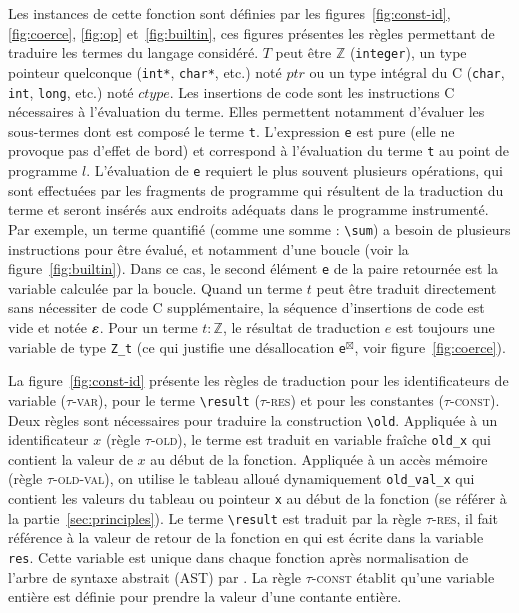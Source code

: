 Les instances de cette fonction sont définies par les
figures~\ref{fig:const-id}, \ref{fig:coerce}, \ref{fig:op} et~\ref{fig:builtin},
ces figures présentes les règles permettant de traduire les termes du langage
\eacsl considéré.
$T$ peut être $\mathbb{Z}$ (\lstinline'integer'), un type pointeur quelconque
(\lstinline'int*', \lstinline'char*', etc.) noté $ptr$ ou un type intégral du C
(\lstinline'char', \lstinline'int', \lstinline'long', etc.) noté $ctype$.
Les insertions de code sont les instructions C nécessaires à l'évaluation du
terme.
Elles permettent notamment d'évaluer les sous-termes dont est composé le terme
\lstinline't'.
L'expression \lstinline'e' est pure (elle ne provoque pas d'effet de bord) et
correspond à l'évaluation du terme \lstinline't' au point de programme $l$.
L'évaluation de \lstinline'e' requiert le plus souvent plusieurs opérations,
qui sont effectuées par les fragments de programme qui résultent de la
traduction du terme et seront insérés aux endroits adéquats dans le programme
instrumenté.
Par exemple, un terme quantifié (comme une somme : \lstinline'\sum') a besoin de
plusieurs instructions pour être évalué, et notamment d'une boucle (voir la
figure~\ref{fig:builtin}).
Dans ce cas, le second élément \lstinline'e' de la paire retournée est la
variable calculée par la boucle.
Quand un terme $t$ peut être traduit directement sans nécessiter de code C
supplémentaire, la séquence d'insertions de code est vide et notée $\varepsilon$.
Pour un terme $t:\mathbb{Z}$, le résultat de traduction $e$ est toujours une
variable de type \lstinline'Z_t' (ce qui justifie une désallocation
\lstinline{e}${}^{\boxtimes}$, voir figure~\ref{fig:coerce}).



La figure~\ref{fig:const-id} présente les règles de traduction pour les
identificateurs de variable (\textsc{$\tau$-var}), pour le terme
\lstinline|\result| (\textsc{$\tau$-res}) et pour les constantes
(\textsc{$\tau$-const}).
Deux règles sont nécessaires pour traduire la construction \eacsl
\lstinline|\old|.
Appliquée à un identificateur $x$ (règle \textsc{$\tau$-old}), le terme est
traduit en variable fraîche \lstinline|old_x| qui contient la valeur de $x$ au
début de la fonction.
Appliquée à un accès mémoire (règle \textsc{$\tau$-old-val}), on utilise le
tableau alloué dynamiquement \lstinline|old_val_x| qui contient les valeurs du
tableau ou pointeur \lstinline'x' au début de la fonction (se référer à la
partie~\ref{sec:principles}).
Le terme \lstinline|\result| est traduit par la règle \textsc{$\tau$-res}, il
fait référence à la valeur de retour de la fonction en \eacsl qui est écrite
dans la variable \lstinline|res|.
Cette variable est unique dans chaque fonction après normalisation de l'arbre de
syntaxe abstrait (AST) par \framac.
La règle \textsc{$\tau$-const} établit qu'une variable entière est définie pour
prendre la valeur d'une contante entière.

